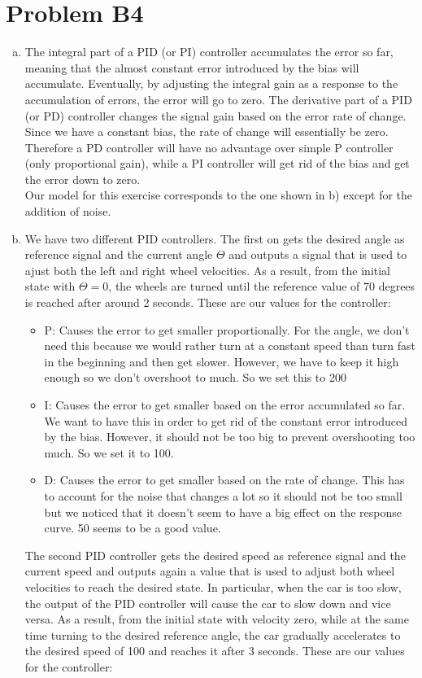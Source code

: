 \documentclass[12pt]{article}
\begin{document}
\section*{Problem B4}
\begin{enumerate}[a)]
	\item The integral part of a PID (or PI) controller accumulates the error so far, meaning that the almost constant error introduced by the bias will accumulate. Eventually, by adjusting the integral gain as a response to the accumulation of errors, the error will go to zero. The derivative part of a PID (or PD) controller changes the signal gain based on the error rate of change. Since we have a constant bias, the rate of change will essentially be zero. Therefore a PD controller will have no advantage over simple P controller (only proportional gain), while a PI controller will get rid of the bias and get the error down to zero.\\
Our model for this exercise corresponds to the one shown in b) except for the addition of noise.\\
	\item We have two different PID controllers. The first on gets the desired angle as reference signal and the current angle $\Theta$ and outputs a signal that is used to ajust both the left and right wheel velocities. As a result, from the initial state with $\Theta = 0$, the wheels are turned until the reference value of 70 degrees is reached after around 2 seconds. These are our values for the controller: 
\begin{itemize}
\item P: Causes the error to get smaller proportionally. For the angle, we don't need this because we would rather turn at a constant speed than turn fast in the beginning and then get slower. However, we have to keep it high enough so we don't overshoot to much. So we set this to 200
\item I: Causes the error to get smaller based on the error accumulated so far. We want to have this in order to get rid of the constant error introduced by the bias. However, it should not be too big to prevent overshooting too much. So we set it to 100.
\item D: Causes the error to get smaller based on the rate of change. This has to account for the noise that changes a lot so it should not be too small but we noticed that it doesn't seem to have a big effect on the response curve. 50 seems to be a good value.
\end{itemize}
The second PID controller gets the desired speed as reference signal and the current speed and outputs again a value that is used to adjust both wheel velocities to reach the desired state. In particular, when the car is too slow, the output of the PID controller will cause the car to slow down and vice versa. As a result, from the initial state with velocity zero, while at the same time turning to the desired reference angle, the car gradually accelerates to the desired speed of 100 and reaches it after 3 seconds. These are our values for the controller:\begin{itemize}

\end{itemize}
\end{enumerate}
\end{document}
